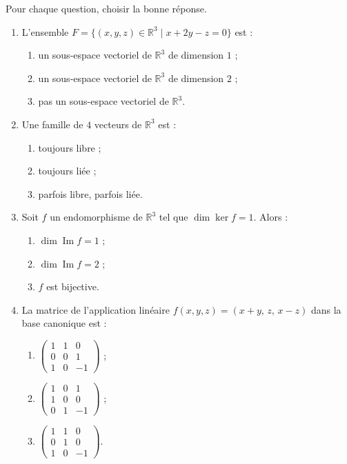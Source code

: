 \documentclass[11pt]{article}
\begin{document}
\begin{exercice}
Pour chaque question, choisir la bonne réponse.
\begin{enumerate}
\item L'ensemble $F = \{(x, y, z) \in \mathbb{R}^3 \mid x + 2y - z = 0\}$ est :
\begin{enumerate}
\item un sous-espace vectoriel de $\mathbb{R}^3$ de dimension $1$ ;
\item un sous-espace vectoriel de $\mathbb{R}^3$ de dimension $2$ ;
\item pas un sous-espace vectoriel de $\mathbb{R}^3$.
\end{enumerate}
\item Une famille de $4$ vecteurs de $\mathbb{R}^3$ est :
\begin{enumerate}
\item toujours libre ; \item toujours liée ; \item parfois libre, parfois liée.
\end{enumerate}
\item Soit $f$ un endomorphisme de $\mathbb{R}^3$ tel que $\dim \ker f = 1$. Alors :
\begin{enumerate}
\item $\dim \operatorname{Im} f = 1$ ; \item $\dim \operatorname{Im} f = 2$ ; \item $f$ est bijective.
\end{enumerate}
\item La matrice de l'application linéaire $f(x, y, z) = (x + y, \, z, \, x - z)$ dans la base canonique est :
\begin{enumerate}
\item $\begin{pmatrix} 1 & 1 & 0 \\ 0 & 0 & 1 \\ 1 & 0 & -1 \end{pmatrix}$ ;
\item $\begin{pmatrix} 1 & 0 & 1 \\ 1 & 0 & 0 \\ 0 & 1 & -1 \end{pmatrix}$ ;
\item $\begin{pmatrix} 1 & 1 & 0 \\ 0 & 1 & 0 \\ 1 & 0 & -1 \end{pmatrix}$.
\end{enumerate}
\end{enumerate}
\end{exercice}
\end{document}
